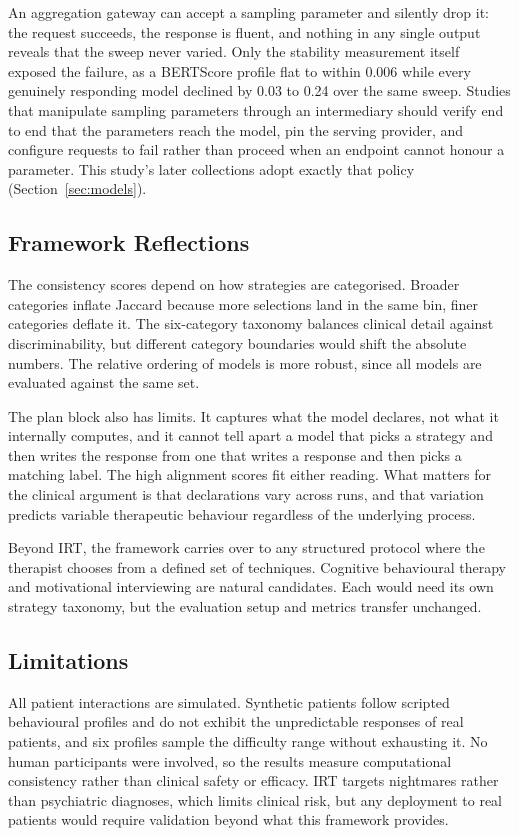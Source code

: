 An aggregation gateway can accept a sampling parameter and silently drop it: the request succeeds, the response is fluent, and nothing in any single output reveals that the sweep never varied. Only the stability measurement itself exposed the failure, as a BERTScore profile flat to within 0.006 while every genuinely responding model declined by 0.03 to 0.24 over the same sweep. Studies that manipulate sampling parameters through an intermediary should verify end to end that the parameters reach the model, pin the serving provider, and configure requests to fail rather than proceed when an endpoint cannot honour a parameter. This study's later collections adopt exactly that policy (Section~\ref{sec:models}).

\subsection{Framework Reflections}
\label{sec:reflections}

The consistency scores depend on how strategies are categorised. Broader categories inflate Jaccard because more selections land in the same bin, finer categories deflate it. The six-category taxonomy balances clinical detail against discriminability, but different category boundaries would shift the absolute numbers. The relative ordering of models is more robust, since all models are evaluated against the same set.

The plan block also has limits. It captures what the model declares, not what it internally computes, and it cannot tell apart a model that picks a strategy and then writes the response from one that writes a response and then picks a matching label. The high alignment scores fit either reading. What matters for the clinical argument is that declarations vary across runs, and that variation predicts variable therapeutic behaviour regardless of the underlying process.

Beyond IRT, the framework carries over to any structured protocol where the therapist chooses from a defined set of techniques. Cognitive behavioural therapy and motivational interviewing are natural candidates. Each would need its own strategy taxonomy, but the evaluation setup and metrics transfer unchanged.

\subsection{Limitations}
\label{sec:limitations}

All patient interactions are simulated. Synthetic patients follow scripted behavioural profiles and do not exhibit the unpredictable responses of real patients, and six profiles sample the difficulty range without exhausting it. No human participants were involved, so the results measure computational consistency rather than clinical safety or efficacy. IRT targets nightmares rather than psychiatric diagnoses, which limits clinical risk, but any deployment to real patients would require validation beyond what this framework provides.

